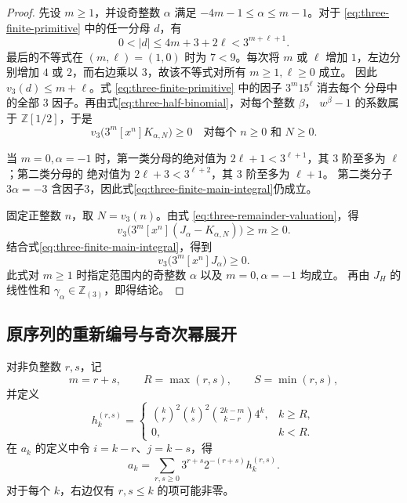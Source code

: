 \documentclass[a4paper,11pt]{article}
\numberwithin{equation}{section}
\theoremstyle{chinese}
\newcommand{\Z}{\mathbb Z}
\begin{document}
\begin{proof}
先设 \(m\ge1\)，并设奇整数 \(\alpha\) 满足
\(-4m-1\le \alpha\le m-1\)。对于
\eqref{eq:three-finite-primitive} 中的任一分母 \(d\)，有
\begin{equation}
0<|d|\le4m+3+2\ell<3^{m+\ell+1}.
\label{eq:three-denominator-bound}
\end{equation}
最后的不等式在 \((m,\ell)=(1,0)\) 时为 \(7<9\)。每次将 \(m\) 或
\(\ell\) 增加 \(1\)，左边分别增加 \(4\) 或 \(2\)，而右边乘以
\(3\)，故该不等式对所有 \(m\ge1,\ell\ge0\) 成立。
因此 \(v_3(d)\le m+\ell\)。式
\eqref{eq:three-finite-primitive} 中的因子 \(3^m15^\ell\) 消去每个
分母中的全部 \(3\) 因子。再由式\eqref{eq:three-half-binomial}，对每个整数 \(\beta\)，
\(w^\beta-1\) 的系数属于 \(\mathbb Z[1/2]\)，于是
\begin{equation}
v_3\bigl(3^m[x^n]K_{\alpha,N}\bigr)\ge0
\quad\text{对每个 }n\ge0\text{ 和 }N\ge0.
\label{eq:three-finite-main-integral}
\end{equation}

当 \(m=0,\alpha=-1\) 时，第一类分母的绝对值为
\(2\ell+1<3^{\ell+1}\)，其 \(3\) 阶至多为 \(\ell\)；第二类分母的
绝对值为 \(2\ell+3<3^{\ell+2}\)，其 \(3\) 阶至多为 \(\ell+1\)。
第二类分子 \(3\alpha=-3\) 含因子3，因此式\eqref{eq:three-finite-main-integral}仍成立。

固定正整数 \(n\)，取 \(N=v_3(n)\)。由式
\eqref{eq:three-remainder-valuation}，得
\[
v_3\bigl(3^m[x^n](J_\alpha-K_{\alpha,N})\bigr)\ge m\ge0.
\]
结合式\eqref{eq:three-finite-main-integral}，得到
\begin{equation}
v_3\bigl(3^m[x^n]J_\alpha\bigr)\ge0.
\label{eq:three-power-integral}
\end{equation}
此式对 $m\ge1$ 时指定范围内的奇整数 $\alpha$ 以及 $m=0,\alpha=-1$ 均成立。
再由 $J_H$ 的线性性和 $\gamma_\alpha\in\Z_{(3)}$，即得结论。
\end{proof}

\subsection{原序列的重新编号与奇次幂展开}

对非负整数 \(r,s\)，记
\[
m=r+s,\qquad R=\max(r,s),\qquad S=\min(r,s),
\]
并定义
\[
h_k^{(r,s)}=
\begin{cases}
\displaystyle
\binom{k}{r}^{\!2}\binom{k}{s}^{\!2}
\binom{2k-m}{k-r}4^k,&k\ge R,\\[2mm]
0,&k<R.
\end{cases}
\]
在 \(a_k\) 的定义中令 \(i=k-r\)、\(j=k-s\)，得
\begin{equation}
a_k=\sum_{r,s\ge0}3^{r+s}2^{-(r+s)}h_k^{(r,s)}.
\label{eq:three-reindex}
\end{equation}
对于每个 \(k\)，右边仅有 \(r,s\le k\) 的项可能非零。
\end{document}
